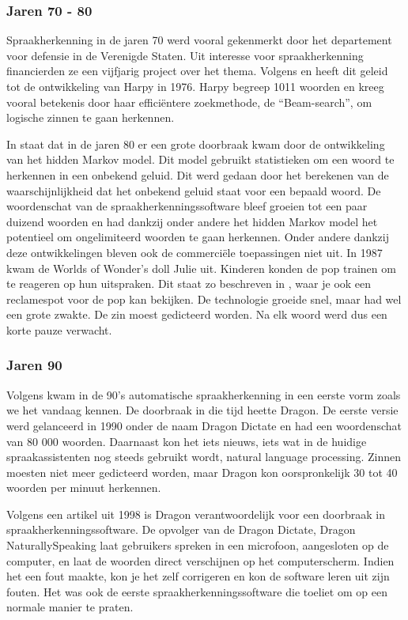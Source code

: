 \subsubsection{Jaren 70 - 80}
Spraakherkenning in de jaren 70 werd vooral gekenmerkt door het departement voor defensie in de Verenigde Staten. Uit interesse voor spraakherkenning financierden ze een vijfjarig project over het thema. Volgens \autocite{Pinola2011} en \autocite{Kincaid2018} heeft dit geleid tot de ontwikkeling van Harpy in 1976. Harpy begreep 1011 woorden en kreeg vooral betekenis door haar efficiëntere zoekmethode, de ``Beam-search'', om logische zinnen te gaan herkennen.

In \autocite{Pinola2011} staat dat in de jaren 80 er een grote doorbraak kwam door de ontwikkeling van het hidden Markov model. Dit model gebruikt statistieken om een woord te herkennen in een onbekend geluid. Dit werd gedaan door het berekenen van de waarschijnlijkheid dat het onbekend geluid staat voor een bepaald woord. De woordenschat van de spraakherkenningssoftware bleef groeien tot een paar duizend woorden en had dankzij onder andere het hidden Markov model het potentieel om ongelimiteerd woorden te gaan herkennen.
Onder andere dankzij deze ontwikkelingen bleven ook de commerciële toepassingen niet uit. In 1987 kwam de Worlds of Wonder's doll Julie uit. Kinderen konden de pop trainen om te reageren op hun uitspraken. Dit staat zo beschreven in \autocite{Pinola2011}, waar je ook een reclamespot voor de pop kan bekijken. De technologie groeide snel, maar had wel een grote zwakte. De zin moest gedicteerd worden. Na elk woord werd dus een korte pauze verwacht.

\subsubsection{Jaren 90}
Volgens \autocite{Kincaid2018} kwam in de 90's automatische spraakherkenning in een eerste vorm zoals we het vandaag kennen. De doorbraak in die tijd heette Dragon. De eerste versie werd gelanceerd in 1990 onder de naam Dragon Dictate en had een woordenschat van 80 000 woorden. Daarnaast kon het iets nieuws, iets wat in de huidige spraakassistenten nog steeds gebruikt wordt, natural language processing. Zinnen moesten niet meer gedicteerd worden, maar Dragon kon oorspronkelijk 30 tot 40 woorden per minuut herkennen.

Volgens een artikel uit 1998 \autocite{Puri1998} is Dragon verantwoordelijk voor een doorbraak in spraakherkenningssoftware. De opvolger van de Dragon Dictate, Dragon NaturallySpeaking laat gebruikers spreken in een microfoon, aangesloten op de computer, en laat de woorden direct verschijnen op het computerscherm. Indien het een fout maakte, kon je het zelf corrigeren en kon de software leren uit zijn fouten. Het was ook de eerste spraakherkenningssoftware die toeliet om op een normale manier te praten.


